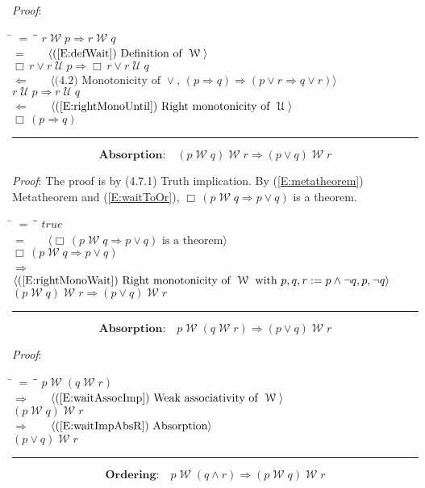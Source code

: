 \documentclass[12pt, fleqn, leqno]{article}
\newcommand{\lgap}{2pt}                             %
\newcommand{\mymathindent}{24pt}                    %
\newcommand{\impl}{\ensuremath{\Rightarrow}}        %
\newcommand{\foll}{\ensuremath{\Leftarrow}}         %
\newcommand{\Until}{\;\mathcal{U}\;}
\newcommand{\Wait}{\;\mathcal{W}\;}
\newcommand{\Always}{\Box\,}
\newcommand{\myqed}{\rule[-.23ex]{1.2ex}{2.0ex}}
\newcommand{\myqedtab}{\hspace{384pt}}              %
\newcommand{\Gll} {\langle}                         %
\newcommand{\Ggg} {\rangle}                         %
\newcommand{\Hint}[1]     {\ \ \ $\Gll              \mbox{#1} \Ggg$ }   %
\begin{document}
\emph{Proof}:
\begin{tabbing}
\hspace{\mymathindent} \= $= \;$ \= \myqedtab \= \kill
  \> \>   $r \Wait p \impl r \Wait q$\\[\lgap]
  \> $=$ \> \Hint{(\ref{E:defWait}) Definition of $\Wait$} \\[\lgap]
  \> \>   $\Always r \lor r \Until p \impl \Always r \lor r \Until q$\\[\lgap]
  \> $\foll$  \>  \Hint{(4.2) Monotonicity of $\lor$, $(p\impl q)\impl (p\lor r \impl q\lor r)$}\\[\lgap]
  \> \>   $r \Until p \impl r \Until q$\\[\lgap]
  \> $\foll$  \>  \Hint{(\ref{E:rightMonoUntil}) Right monotonicity of $\Until$}\\[\lgap]
  \> \>   $\Always (p \impl q)$ \quad \myqed
\end{tabbing}
\begin{equation}\label{E:waitImpAbsR}
\textbf{Absorption:}\quad (p \Wait q) \Wait r \impl (p \lor q) \Wait r
\end{equation}

\emph{Proof}: The proof is by (4.7.1) Truth implication.
By (\ref{E:metatheorem}) Metatheorem and (\ref{E:waitToOr}), $\Always (p\Wait q\impl p\lor q)$ is a theorem.
\begin{tabbing}
\hspace{\mymathindent} \= $= \;$ \= \myqedtab \= \kill
  \> \>   $true$\\[\lgap]
  \> $=$ \> \Hint{$\Always (p\Wait q\impl p\lor q)$ is a theorem} \\[\lgap]
  \> \>   $\Always (p\Wait q\impl p\lor q)$\\[\lgap]
  \> $\impl$  \>  \Hint{(\ref{E:rightMonoWait}) Right monotonicity of $\Wait$ with $p,q,r := p\land \neg q, p, \neg q$}\\[\lgap]
  \> \>   $(p \Wait q) \Wait r \impl (p \lor q) \Wait r$ \quad \myqed
\end{tabbing}
\begin{equation}\label{E:waitImpAbsL}
\textbf{Absorption:}\quad p \Wait (q \Wait r) \impl (p \lor q) \Wait r
\end{equation}

\emph{Proof}:
\begin{tabbing}
\hspace{\mymathindent} \= $= \;$ \= \myqedtab \= \kill
\> \> $p \Wait (q \Wait r)$\\[\lgap]
\> $\impl$ \> \Hint{(\ref{E:waitAssocImp}) Weak associativity of $\Wait$}\\[\lgap]
\> \> $(p \Wait q) \Wait r$\\[\lgap]
\> $\impl$ \> \Hint{(\ref{E:waitImpAbsR}) Absorption} \\[\lgap]
\> \> $(p \lor q) \Wait r$ \quad \myqed
\end{tabbing}
\begin{equation}\label{E:waitOrderingThree}
\textbf{Ordering:}\quad p \Wait (q \land r) \impl (p \Wait q) \Wait r
\end{equation}
\end{document}
